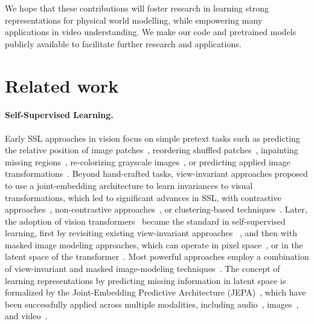 \documentclass[]{fairmeta}
\begin{document}
We hope that these contributions will foster research in learning strong representations for physical world modelling, while empowering many applications in video understanding. We make our code and pretrained models publicly available to facilitate further research and applications.







\section{Related work} \label{section:related_work}

\paragraph{\textbf{Self-Supervised Learning.}}

Early SSL approaches in vision focus on simple pretext tasks such as predicting the relative position of image patches~\citep{doersch2015context}, reordering shuffled patches~\citep{noroozi2016jigsaw, misra2020pirl}, inpainting missing regions~\citep{pathak2016context}, re-colorizing grayscale images~\citep{zhang2016colorful}, or predicting applied image transformations~\citep{gidaris2018rotnet}. Beyond hand-crafted tasks, view-invariant approaches proposed to use a joint-embedding architecture to learn invariances to visual transformations, which led to significant advances in SSL, with contrastive approaches~\citep{henaff2019data, he2020moco, chen2020simclr}, non-contrastive approaches~\citep{chen2020simsiam, grill2020byol, bardes2021vicreg}, or clustering-based techniques~\citep{caron2018clustering, caron2020swav}. Later, the adoption of vision transformers~\citep{dosovitskiy2020image} became the standard in self-supervised learning, first by revisiting existing view-invariant approaches ~\citep{chen2021mocov3, caron2021dino}, and then with masked image modeling approaches, which can operate in pixel space~\citep{xie2021simmim, wei2021masked}, or in the latent space of the transformer~\citep{Bao2021beit}. Most powerful approaches employ a combination of view-invariant and masked image-modeling techniques~\citep{zhou2021ibot, oquab2023dinov2}. The concept of learning representations by predicting missing information in latent space is formalized by the Joint-Embedding Predictive Architecture (JEPA)~\citep{lecun2022path}, which have been successfully applied across multiple modalities, including audio~\citep{baevski2022data2vec}, images~\citep{assran2023self,barstochastic}, and video~\citep{bardes2024revisiting}.
\end{document}
